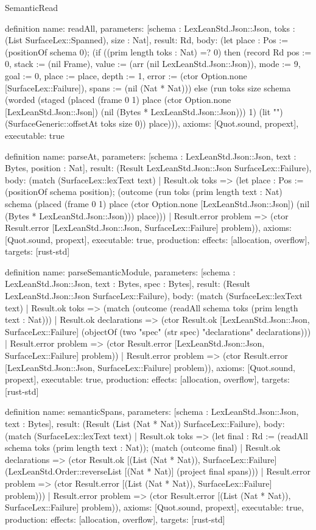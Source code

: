 \begin{lexlean}{SemanticRead}
\begin{semanticmodule}
definition{
  name: readAll,
  parameters: [schema : LexLeanStd.Json::Json, toks : (List SurfaceLex::Spanned), size : Nat],
  result: Rd,
  body: (let place : Pos := (positionOf schema 0); (if ((prim length toks : Nat) =? 0) then (record Rd {pos := 0, stack := (nil Frame), value := (arr (nil LexLeanStd.Json::Json)), mode := 9, goal := 0, place := place, depth := 1, error := (ctor Option.none [SurfaceLex::Failure]), spans := (nil (Nat * Nat))}) else (run toks size schema (worded (staged (placed (frame 0 1) place (ctor Option.none [LexLeanStd.Json::Json]) (nil (Bytes * LexLeanStd.Json::Json))) 1) (lit "") (SurfaceGeneric::offsetAt toks size 0)) place))),
  axioms: [Quot.sound, propext],
  executable: true
}

definition{
  name: parseAt,
  parameters: [schema : LexLeanStd.Json::Json, text : Bytes, position : Nat],
  result: (Result LexLeanStd.Json::Json SurfaceLex::Failure),
  body: (match (SurfaceLex::lexText text)
    | Result.ok toks => (let place : Pos := (positionOf schema position); (outcome (run toks (prim length text : Nat) schema (placed (frame 0 1) place (ctor Option.none [LexLeanStd.Json::Json]) (nil (Bytes * LexLeanStd.Json::Json))) place)))
    | Result.error problem => (ctor Result.error [LexLeanStd.Json::Json, SurfaceLex::Failure] problem)),
  axioms: [Quot.sound, propext],
  executable: true,
  production: {effects: [allocation, overflow], targets: [rust-std]}
}

definition{
  name: parseSemanticModule,
  parameters: [schema : LexLeanStd.Json::Json, text : Bytes, spec : Bytes],
  result: (Result LexLeanStd.Json::Json SurfaceLex::Failure),
  body: (match (SurfaceLex::lexText text)
    | Result.ok toks => (match (outcome (readAll schema toks (prim length text : Nat)))
      | Result.ok declarations => (ctor Result.ok [LexLeanStd.Json::Json, SurfaceLex::Failure] (objectOf (two "spec" (str spec) "declarations" declarations)))
      | Result.error problem => (ctor Result.error [LexLeanStd.Json::Json, SurfaceLex::Failure] problem))
    | Result.error problem => (ctor Result.error [LexLeanStd.Json::Json, SurfaceLex::Failure] problem)),
  axioms: [Quot.sound, propext],
  executable: true,
  production: {effects: [allocation, overflow], targets: [rust-std]}
}

definition{
  name: semanticSpans,
  parameters: [schema : LexLeanStd.Json::Json, text : Bytes],
  result: (Result (List (Nat * Nat)) SurfaceLex::Failure),
  body: (match (SurfaceLex::lexText text)
    | Result.ok toks => (let final : Rd := (readAll schema toks (prim length text : Nat)); (match (outcome final)
      | Result.ok declarations => (ctor Result.ok [(List (Nat * Nat)), SurfaceLex::Failure] (LexLeanStd.Order::reverseList [(Nat * Nat)] (project final spans)))
      | Result.error problem => (ctor Result.error [(List (Nat * Nat)), SurfaceLex::Failure] problem)))
    | Result.error problem => (ctor Result.error [(List (Nat * Nat)), SurfaceLex::Failure] problem)),
  axioms: [Quot.sound, propext],
  executable: true,
  production: {effects: [allocation, overflow], targets: [rust-std]}
}
\end{semanticmodule}
\end{lexlean}
